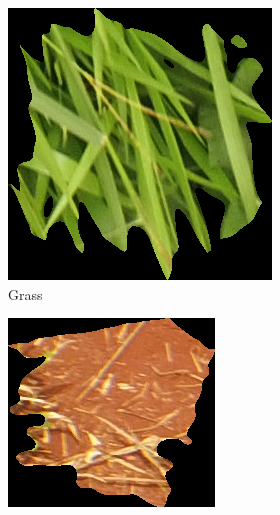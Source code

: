 \documentclass{report}
\begin{document}
\begin{figure}[H]
     \begin{subfigure}[b]{0.3\textwidth}
\includegraphics[width=\textwidth]{Grass.png}
         \caption{Grass}
         \label{fig:2}
     \end{subfigure}
     \begin{subfigure}[b]{0.3\textwidth}
         \includegraphics[width=\textwidth]{Soil.png}

\end{subfigure}
\end{figure}
\end{document}
